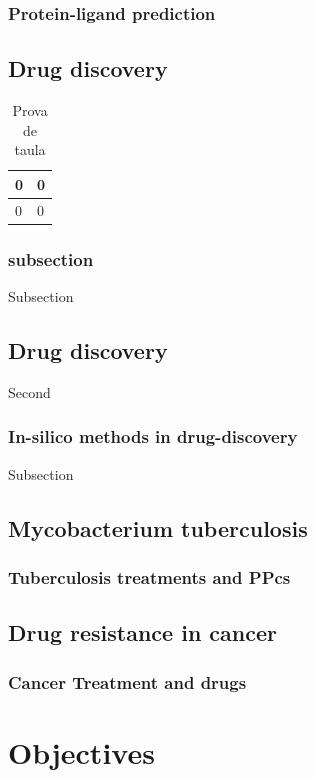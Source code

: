 \documentclass[12pt, a4paper,twoside]{tesi_upf}
\begin{document}
\subsection{Protein-ligand prediction}


\section{Drug discovery}



\begin{table}[h]
  \centering
  \begin{tabular}{|l|l|}
   \hline
    0 & 0 \\ \hline
    0 & 0 \\ \hline    
  \end{tabular}
  \caption{Prova de taula}

\end{table}

\subsection{subsection}
Subsection

\section{Drug discovery}
Second
\subsection{In-silico methods in drug-discovery}
Subsection
\section{Mycobacterium tuberculosis}
\subsection{Tuberculosis treatments and PPcs}
\section{Drug resistance in cancer}
\subsection{Cancer Treatment and drugs}





\chapter{Objectives}
\end{document}
